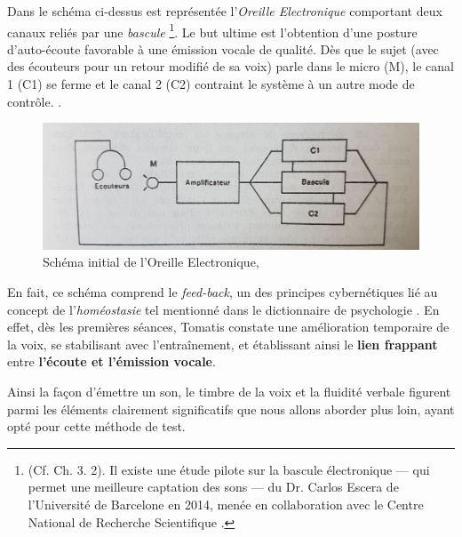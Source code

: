 Dans le schéma ci-dessus est représentée l'\textit{Oreille Electronique}
comportant deux canaux reliés par une
\textit{bascule} \footnote{(Cf. Ch. 3. 2). Il existe une étude pilote sur la bascule électronique   ---  qui permet
une meilleure
captation des sons  --- du Dr. Carlos Escera
de l'Université de Barcelone en 2014, menée en collaboration avec le
Centre National de Recherche Scientifique
\href{http://tomatisassociation.org/scientific-validation-of-the-tomatis-effect-
eeg-recordings-of-sound-from-brainstem-to-cerebral-cortex-encoding-university-of
-barcelona-2014/}\autocite{tomatisassociation.org}.}.
Le but ultime est l'obtention d'une posture d'auto-écoute favorable à une
          émission vocale de qualité.
Dès que le sujet (avec
des écouteurs pour un retour modifié de sa voix) parle
dans le micro (M), le canal 1 (C1) se ferme et  le canal 2 (C2) contraint le
système à un autre mode de contrôle.
.

\begin{figure}
	\centering
	\includegraphics[width=0.7\linewidth]{images/oreilleelectro.jpg}
	\caption[oreilleelectro]{Schéma initial de l'Oreille
          Electronique,\autocite[ch.~3, p.~97]{tomatis_oreille_1998}}

	\label{oreilleelectro}
\end{figure}
En fait, ce schéma comprend le\textit{ feed-back}, un des principes
cybernétiques lié au concept de l'\textit{homéostasie} tel
mentionné dans le dictionnaire de
psychologie \autocite[298]{doronparot}.
En effet, dès les premières
séances, Tomatis constate une amélioration temporaire de la voix, se
stabilisant avec l'entraînement, et établissant ainsi le
\textbf{lien frappant} entre\textbf{ l'écoute et
  l'émission vocale}.

Ainsi la façon d'émettre un son, le timbre de la voix et la fluidité
verbale figurent parmi les
éléments clairement significatifs que nous allons aborder plus loin, ayant opté pour
cette méthode de test.

